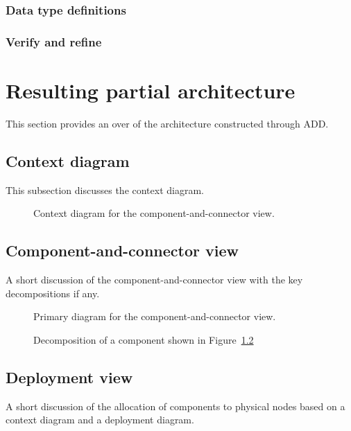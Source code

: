 \documentclass[english]{sareport}
\begin{document}
\subsection{Data type definitions}
\subsection{Verify and refine}

\chapter{Resulting partial architecture}\label{sec:architecture}
This section provides an over of the architecture constructed through ADD\@.

\section{Context diagram}
This subsection discusses the context diagram.

\begin{figure}[!htp]
	\centering
	\caption{Context diagram for the component-and-connector view.
	}\label{fig:cc_context}
\end{figure}

\section{Component-and-connector view}
A short discussion of the component-and-connector view with the key
decompositions if any.

\begin{figure}[!htp]
	\centering
	\caption{Primary diagram for the component-and-connector view.
	}\label{fig:cc_main}
\end{figure}

\begin{figure}[!htp]
	\centering
	\caption{Decomposition of a component shown in Figure~\ref{fig:cc_main}
	}\label{fig:decomp_decomp1}
\end{figure}

\section{Deployment view}
A short discussion of the allocation of components to physical nodes based on a
context diagram and a deployment diagram.
\end{document}

